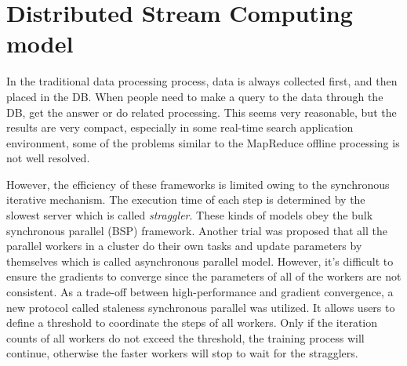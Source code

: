 \documentclass[journal]{IEEEtran}
\begin{document}
\section{Distributed Stream Computing model}
In the traditional data processing process, data is always collected first, and then placed in the DB. When people need to make a query to the data through the DB, get the answer or do related processing. This seems very reasonable, but the results are very compact, especially in some real-time search application environment, some of the problems similar to the MapReduce offline processing is not well resolved.

However, the efficiency of these frameworks is limited owing to the synchronous iterative mechanism. The execution time of each step is determined by the slowest server which is called \textit{straggler}. These kinds of models obey the bulk synchronous parallel (BSP) \cite{valiant1990bridging} framework. Another trial was proposed that all the parallel workers in a cluster do their own tasks and update parameters by themselves which is called asynchronous parallel model. However, it's difficult to ensure the gradients to converge since the parameters of all of the workers are not consistent. As a trade-off between high-performance and gradient convergence, a new protocol called staleness synchronous parallel was utilized. It allows users to define a threshold to coordinate the steps of all workers. Only if the iteration counts of all workers do not exceed the threshold, the training process will continue, otherwise the faster workers will stop to wait for the stragglers.
\end{document}

